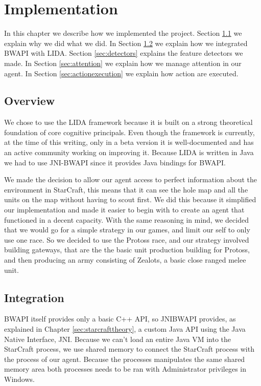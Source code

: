 
\chapter{Implementation}
In this chapter we describe how we implemented the project.
Section \ref{sec:overview} we explain why we did what we did.
In Section \ref{sec:integration} we explain how we integrated BWAPI with LIDA.
Section \ref{sec:detectors} explains the feature detectors we made.
In Section \ref{sec:attention} we explain how we manage attention in our agent.
In Section \ref{sec:actionexecution} we explain how action are executed.

\section{Overview}
\label{sec:overview}
We chose to use the LIDA framework because it is built on a strong theoretical foundation of core cognitive principals. Even though the framework is currently, at the time of this writing, only in a beta version it is well-documented and has an active community working on improving it. Because LIDA is written in Java we had to use JNI-BWAPI since it provides Java bindings for BWAPI. 

We made the decision to allow our agent access to perfect information about the environment in StarCraft, this means that it can see the hole map and all the units on the map without having to scout first. We did this because it simplified our implementation and made it easier to begin with to create an agent that functioned in a decent capacity. With the same reasoning in mind, we decided that we would go for a simple strategy in our games, and limit our self to only use one race. So we decided to use the Protoss race, and our strategy involved building gateways, that are the the basic unit production building for Protoss, and then producing an army consisting of Zealots, a basic close ranged melee unit. 

\section{Integration}
\label{sec:integration}
BWAPI itself provides only a basic C++ API, so JNIBWAPI provides, as explained in Chapter \ref{sec:starcrafttheory}, a custom Java API using the Java Native Interface, JNI.\cite{jni} Because we can't load an entire Java VM into the StarCraft process, we use shared memory to connect the StarCraft process with the process of our agent. Because the processes manipulates the same shared memory area both processes needs to be ran with Administrator privileges in Windows.


